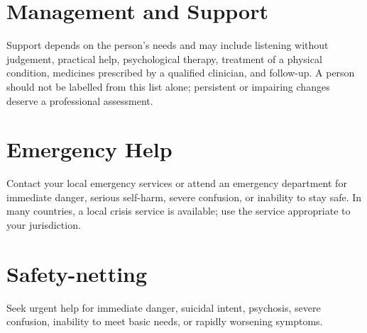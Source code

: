 \section*{Management and Support}
Support depends on the person's needs and may include listening without judgement, practical help, psychological therapy, treatment of a physical condition, medicines prescribed by a qualified clinician, and follow-up. A person should not be labelled from this list alone; persistent or impairing changes deserve a professional assessment.

\section*{Emergency Help}
Contact your local emergency services or attend an emergency department for immediate danger, serious self-harm, severe confusion, or inability to stay safe. In many countries, a local crisis service is available; use the service appropriate to your jurisdiction.
\section*{Safety-netting}
Seek urgent help for immediate danger, suicidal intent, psychosis, severe confusion, inability to meet basic needs, or rapidly worsening symptoms.
